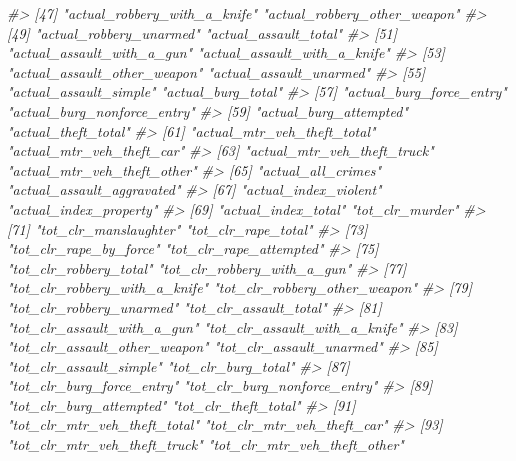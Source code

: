 \documentclass[
  12pt,
]{book}
\newenvironment{Shaded}{\begin{snugshade}}{\end{snugshade}}
\newcommand{\CommentTok}[1]{\textcolor[rgb]{0.37,0.37,0.37}{\textit{#1}}}
\begin{document}
\begin{Shaded}
\begin{Highlighting}[]
\CommentTok{\#\textgreater{}  [47] "actual\_robbery\_with\_a\_knife"    "actual\_robbery\_other\_weapon"   }
\CommentTok{\#\textgreater{}  [49] "actual\_robbery\_unarmed"         "actual\_assault\_total"          }
\CommentTok{\#\textgreater{}  [51] "actual\_assault\_with\_a\_gun"      "actual\_assault\_with\_a\_knife"   }
\CommentTok{\#\textgreater{}  [53] "actual\_assault\_other\_weapon"    "actual\_assault\_unarmed"        }
\CommentTok{\#\textgreater{}  [55] "actual\_assault\_simple"          "actual\_burg\_total"             }
\CommentTok{\#\textgreater{}  [57] "actual\_burg\_force\_entry"        "actual\_burg\_nonforce\_entry"    }
\CommentTok{\#\textgreater{}  [59] "actual\_burg\_attempted"          "actual\_theft\_total"            }
\CommentTok{\#\textgreater{}  [61] "actual\_mtr\_veh\_theft\_total"     "actual\_mtr\_veh\_theft\_car"      }
\CommentTok{\#\textgreater{}  [63] "actual\_mtr\_veh\_theft\_truck"     "actual\_mtr\_veh\_theft\_other"    }
\CommentTok{\#\textgreater{}  [65] "actual\_all\_crimes"              "actual\_assault\_aggravated"     }
\CommentTok{\#\textgreater{}  [67] "actual\_index\_violent"           "actual\_index\_property"         }
\CommentTok{\#\textgreater{}  [69] "actual\_index\_total"             "tot\_clr\_murder"                }
\CommentTok{\#\textgreater{}  [71] "tot\_clr\_manslaughter"           "tot\_clr\_rape\_total"            }
\CommentTok{\#\textgreater{}  [73] "tot\_clr\_rape\_by\_force"          "tot\_clr\_rape\_attempted"        }
\CommentTok{\#\textgreater{}  [75] "tot\_clr\_robbery\_total"          "tot\_clr\_robbery\_with\_a\_gun"    }
\CommentTok{\#\textgreater{}  [77] "tot\_clr\_robbery\_with\_a\_knife"   "tot\_clr\_robbery\_other\_weapon"  }
\CommentTok{\#\textgreater{}  [79] "tot\_clr\_robbery\_unarmed"        "tot\_clr\_assault\_total"         }
\CommentTok{\#\textgreater{}  [81] "tot\_clr\_assault\_with\_a\_gun"     "tot\_clr\_assault\_with\_a\_knife"  }
\CommentTok{\#\textgreater{}  [83] "tot\_clr\_assault\_other\_weapon"   "tot\_clr\_assault\_unarmed"       }
\CommentTok{\#\textgreater{}  [85] "tot\_clr\_assault\_simple"         "tot\_clr\_burg\_total"            }
\CommentTok{\#\textgreater{}  [87] "tot\_clr\_burg\_force\_entry"       "tot\_clr\_burg\_nonforce\_entry"   }
\CommentTok{\#\textgreater{}  [89] "tot\_clr\_burg\_attempted"         "tot\_clr\_theft\_total"           }
\CommentTok{\#\textgreater{}  [91] "tot\_clr\_mtr\_veh\_theft\_total"    "tot\_clr\_mtr\_veh\_theft\_car"     }
\CommentTok{\#\textgreater{}  [93] "tot\_clr\_mtr\_veh\_theft\_truck"    "tot\_clr\_mtr\_veh\_theft\_other"   }

\end{Highlighting}
\end{Shaded}
\end{document}
